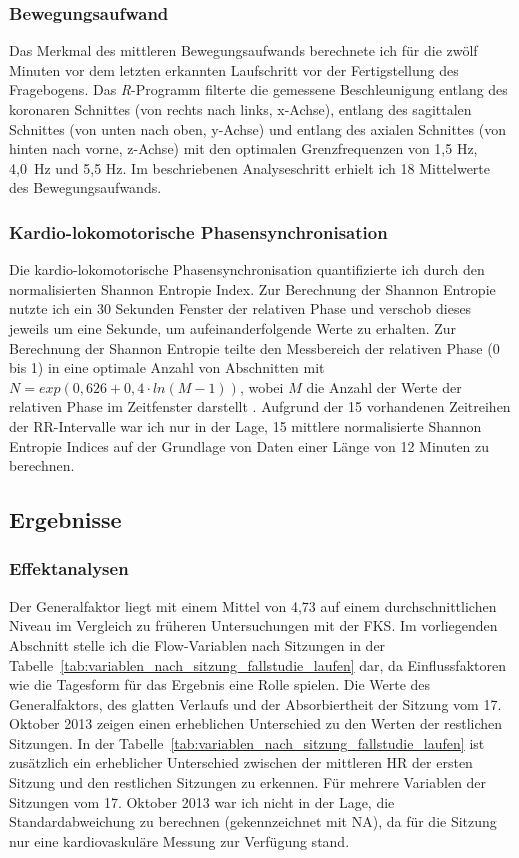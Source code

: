 \subsubsection{Bewegungsaufwand}
\label{ssub:bewegungsaufwand_1}
Das Merkmal des mittleren Bewegungsaufwands berechnete ich für die zwölf Minuten vor dem letzten erkannten Laufschritt vor der Fertigstellung des Fragebogens. Das \emph{R}-Programm filterte die gemessene Beschleunigung entlang des koronaren Schnittes (von rechts nach links, x-Achse), entlang des sagittalen Schnittes (von unten nach oben, y-Achse) und entlang des axialen Schnittes (von hinten nach vorne, z-Achse) mit den optimalen Grenzfrequenzen von 1,5 Hz, 4,0~Hz und 5,5 Hz. Im beschriebenen Analyseschritt erhielt ich 18 Mittelwerte des Bewegungsaufwands.

\subsubsection{Kardio-lokomotorische Phasensynchronisation}
\label{ssub:kardio_lokomotorische_phasensynchronisation_1}
Die kardio-lokomotorische Phasensynchronisation quantifizierte ich durch den normalisierten Shannon Entropie Index. Zur Berechnung der Shannon Entropie nutzte ich ein 30 Sekunden Fenster der relativen Phase und verschob dieses jeweils um eine Sekunde, um aufeinanderfolgende Werte zu erhalten. Zur Berechnung der Shannon Entropie teilte den Messbereich der relativen Phase (0 bis 1) in eine optimale Anzahl von Abschnitten mit $N = exp(0{,}626 + 0{,}4 \cdot ln(M-1))$, wobei $M$ die Anzahl der Werte der relativen Phase im Zeitfenster darstellt \citep[vgl.][S.~20]{Rosenblum2003}. Aufgrund der 15 vorhandenen Zeitreihen der RR-Intervalle war ich nur in der Lage, 15 mittlere normalisierte Shannon Entropie Indices auf der Grundlage von Daten einer Länge von 12 Minuten zu berechnen.

\subsection{Ergebnisse}
\subsubsection{Effektanalysen}
Der Generalfaktor liegt mit einem Mittel von 4,73 auf einem durchschnittlichen Niveau im Vergleich zu früheren Untersuchungen mit der \ac{FKS}. Im vorliegenden Abschnitt stelle ich die Flow-Variablen nach Sitzungen in der Tabelle~\ref{tab:variablen_nach_sitzung_fallstudie_laufen} dar, da Einflussfaktoren wie die Tagesform für das Ergebnis eine Rolle spielen. Die Werte des Generalfaktors, des glatten Verlaufs und der Absorbiertheit der Sitzung vom 17. Oktober 2013 zeigen einen erheblichen Unterschied zu den Werten der restlichen Sitzungen. In der Tabelle~\ref{tab:variablen_nach_sitzung_fallstudie_laufen} ist zusätzlich ein erheblicher Unterschied zwischen der mittleren \ac{HR} der ersten Sitzung und den restlichen Sitzungen zu erkennen. Für mehrere Variablen der Sitzungen vom 17. Oktober 2013 war ich nicht in der Lage, die Standardabweichung zu berechnen (gekennzeichnet mit NA), da für die Sitzung nur eine kardiovaskuläre Messung zur Verfügung stand.

